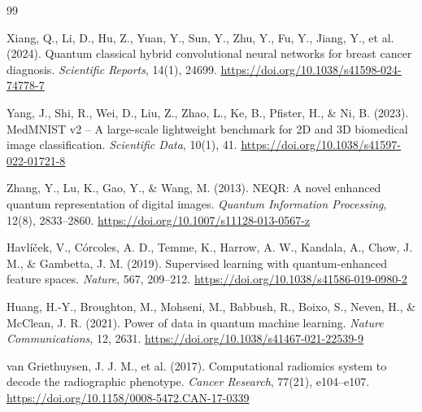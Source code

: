 \begin{thebibliography}{99}

    Xiang, Q., Li, D., Hu, Z., Yuan, Y., Sun, Y., Zhu, Y., Fu, Y., Jiang, Y., et al. (2024).
    Quantum classical hybrid convolutional neural networks for breast cancer diagnosis.
    \textit{Scientific Reports}, 14(1), 24699.
    \url{https://doi.org/10.1038/s41598-024-74778-7}


    Yang, J., Shi, R., Wei, D., Liu, Z., Zhao, L., Ke, B., Pfister, H., \& Ni, B. (2023).
    MedMNIST v2 -- A large-scale lightweight benchmark for 2D and 3D biomedical image classification.
    \textit{Scientific Data}, 10(1), 41.
    \url{https://doi.org/10.1038/s41597-022-01721-8}

    Zhang, Y., Lu, K., Gao, Y., \& Wang, M. (2013).
    NEQR: A novel enhanced quantum representation of digital images.
    \textit{Quantum Information Processing}, 12(8), 2833--2860.
    \url{https://doi.org/10.1007/s11128-013-0567-z}

    Havl{\'{i}}{\v{c}}ek, V., C{\'{o}}rcoles, A. D., Temme, K., Harrow, A. W., Kandala, A., Chow, J. M., \& Gambetta, J. M. (2019). Supervised learning with quantum-enhanced feature spaces.
    \textit{Nature}, 567, 209--212.
    \url{https://doi.org/10.1038/s41586-019-0980-2}


    Huang, H.-Y., Broughton, M., Mohseni, M., Babbush, R., Boixo, S., Neven, H., \& McClean, J. R. (2021). Power of data in quantum machine learning.
    \textit{Nature Communications}, 12, 2631.
    \url{https://doi.org/10.1038/s41467-021-22539-9}


    van Griethuysen, J. J. M., et al. (2017). Computational radiomics system to decode the radiographic phenotype.
    \textit{Cancer Research}, 77(21), e104--e107.
    \url{https://doi.org/10.1158/0008-5472.CAN-17-0339}

\end{thebibliography}
